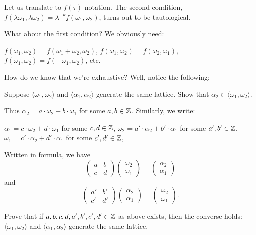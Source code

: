 Let us translate to $f(\tau)$ notation.
The second condition, $f(\lambda \omega_1, \lambda \omega_2) = \lambda^{-k} f(\omega_1, \omega_2)$,
turns out to be tautological.

What about the first condition?
We obviously need:
\begin{itemize}
	\ii $f(\omega_1, \omega_2) = f(\omega_1+\omega_2, \omega_2)$,
	\ii $f(\omega_1, \omega_2) = f(\omega_2, \omega_1)$,
	\ii $f(\omega_1, \omega_2) = f(-\omega_1, \omega_2)$,
	\ii etc.
\end{itemize}

How do we know that we're exhaustive? Well, notice the following:
\begin{exercise}
	Suppose $\langle \omega_1, \omega_2 \rangle$ and $\langle \alpha_1, \alpha_2 \rangle$
	generate the same lattice. Show that $\alpha_2 \in \langle \omega_1, \omega_2 \rangle$.
\end{exercise}
Thus $\alpha_2 = a  \cdot \omega_2+b  \cdot \omega_1$ for some $a, b \in \mathbb Z$.
Similarly, we write:
\begin{itemize}
	\ii $\alpha_1 = c  \cdot \omega_2+d  \cdot \omega_1$ for some $c, d \in \mathbb Z$,
	\ii $\omega_2 = a' \cdot \alpha_2+b' \cdot \alpha_1$ for some $a', b' \in \mathbb Z$.
	\ii $\omega_1 = c' \cdot \alpha_2+d' \cdot \alpha_1$ for some $c', d' \in \mathbb Z$,
\end{itemize}

Written in formula, we have
\[ \begin{pmatrix} a&b \\ c&d \end{pmatrix} \begin{pmatrix} \omega_2 \\ \omega_1 \end{pmatrix}
= \begin{pmatrix} \alpha_2 \\ \alpha_1 \end{pmatrix} \]
and
\[ \begin{pmatrix} a'&b' \\ c'&d' \end{pmatrix} \begin{pmatrix} \alpha_2 \\ \alpha_1 \end{pmatrix}
= \begin{pmatrix} \omega_2 \\ \omega_1 \end{pmatrix}. \]

\begin{exercise}
	Prove that if $a, b, c, d, a', b', c', d' \in \mathbb Z$ as above exists, then the converse holds:
	$\langle \omega_1, \omega_2 \rangle$ and $\langle \alpha_1, \alpha_2 \rangle$
	generate the same lattice.
\end{exercise}

